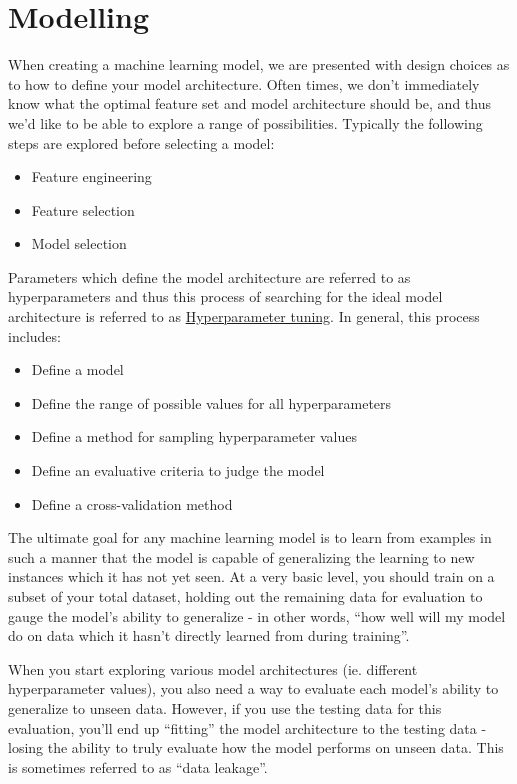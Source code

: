 \documentclass{book}
\begin{document}
\chapter{Modelling}
When creating a machine learning model, we are presented with design choices as to how to define your model architecture. Often times, we don't immediately know what the optimal feature set and model architecture should be, and thus we'd like to be able to explore a range of possibilities.
Typically the following steps are explored before selecting a model: 
\begin{itemize}
\item Feature engineering
\item Feature selection
\item Model selection
\end{itemize}
Parameters which define the model architecture are referred to as hyperparameters and thus this process of searching for the ideal model architecture is referred to as \href{https://www.jeremyjordan.me/hyperparameter-tuning/}{Hyperparameter tuning}.
In general, this process includes:
\begin{itemize}
\item Define a model
\item Define the range of possible values for all hyperparameters
\item Define a method for sampling hyperparameter values
\item Define an evaluative criteria to judge the model
\item Define a cross-validation method
\end{itemize}
The ultimate goal for any machine learning model is to learn from examples in such a manner that the model is capable of generalizing the learning to new instances which it has not yet seen. At a very basic level, you should train on a subset of your total dataset, holding out the remaining data for evaluation to gauge the model's ability to generalize - in other words, ``how well will my model do on data which it hasn't directly learned from during training''.

When you start exploring various model architectures (ie. different hyperparameter values), you also need a way to evaluate each model's ability to generalize to unseen data. However, if you use the testing data for this evaluation, you'll end up ``fitting'' the model architecture to the testing data - losing the ability to truly evaluate how the model performs on unseen data. This is sometimes referred to as ``data leakage''.
\end{document}
